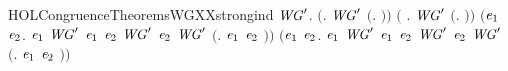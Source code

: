 \newcommand{\HOLCongruenceTheoremsWGXXrules}{\UseVerbatim{HOLCongruenceTheoremsWGXXrules}}
\begin{SaveVerbatim}{HOLCongruenceTheoremsWGXXstrongind}
\HOLTokenTurnstile{} \HOLSymConst{\HOLTokenForall{}}\ensuremath{\HOLBoundVar{WG}\sp{\prime}}.
       \ensuremath{(}\HOLSymConst{\HOLTokenForall{}}. \ensuremath{\HOLBoundVar{WG}\sp{\prime}} \ensuremath{(}\HOLTokenLambda{}. \ensuremath{)}\ensuremath{)} \HOLSymConst{\HOLTokenConj{}} \ensuremath{(}\HOLSymConst{\HOLTokenForall{}} .   \HOLSymConst{\HOLTokenImp{}} \ensuremath{\HOLBoundVar{WG}\sp{\prime}} \ensuremath{(}\HOLTokenLambda{}. \HOLSymConst{\ensuremath{\ldotp}} \ensuremath{)}\ensuremath{)} \HOLSymConst{\HOLTokenConj{}}
       \ensuremath{(}\HOLSymConst{\HOLTokenForall{}}\ensuremath{\HOLBoundVar{e}\sb{\mathrm{1}}} \ensuremath{\HOLBoundVar{e}\sb{\mathrm{2}}}.
             \ensuremath{\HOLBoundVar{e}\sb{\mathrm{1}}} \HOLSymConst{\HOLTokenConj{}} \ensuremath{\HOLBoundVar{WG}\sp{\prime}} \ensuremath{\HOLBoundVar{e}\sb{\mathrm{1}}} \HOLSymConst{\HOLTokenConj{}}  \ensuremath{\HOLBoundVar{e}\sb{\mathrm{2}}} \HOLSymConst{\HOLTokenConj{}} \ensuremath{\HOLBoundVar{WG}\sp{\prime}} \ensuremath{\HOLBoundVar{e}\sb{\mathrm{2}}} \HOLSymConst{\HOLTokenImp{}}
            \ensuremath{\HOLBoundVar{WG}\sp{\prime}} \ensuremath{(}\HOLTokenLambda{}. \ensuremath{\HOLBoundVar{e}\sb{\mathrm{1}}}  \HOLSymConst{\ensuremath{+}} \ensuremath{\HOLBoundVar{e}\sb{\mathrm{2}}} \ensuremath{)}\ensuremath{)} \HOLSymConst{\HOLTokenConj{}}
       \ensuremath{(}\HOLSymConst{\HOLTokenForall{}}\ensuremath{\HOLBoundVar{e}\sb{\mathrm{1}}} \ensuremath{\HOLBoundVar{e}\sb{\mathrm{2}}}.
             \ensuremath{\HOLBoundVar{e}\sb{\mathrm{1}}} \HOLSymConst{\HOLTokenConj{}} \ensuremath{\HOLBoundVar{WG}\sp{\prime}} \ensuremath{\HOLBoundVar{e}\sb{\mathrm{1}}} \HOLSymConst{\HOLTokenConj{}}  \ensuremath{\HOLBoundVar{e}\sb{\mathrm{2}}} \HOLSymConst{\HOLTokenConj{}} \ensuremath{\HOLBoundVar{WG}\sp{\prime}} \ensuremath{\HOLBoundVar{e}\sb{\mathrm{2}}} \HOLSymConst{\HOLTokenImp{}}
            \ensuremath{\HOLBoundVar{WG}\sp{\prime}} \ensuremath{(}\HOLTokenLambda{}. \ensuremath{\HOLBoundVar{e}\sb{\mathrm{1}}}  \HOLSymConst{\ensuremath{\mid}} \ensuremath{\HOLBoundVar{e}\sb{\mathrm{2}}} \ensuremath{)}\ensuremath{)} \HOLSymConst{\HOLTokenConj{}}

\end{SaveVerbatim}
